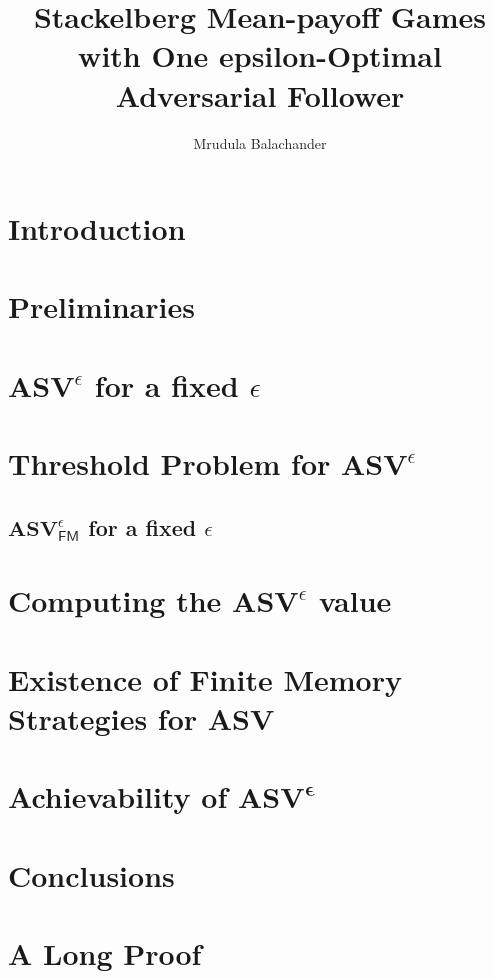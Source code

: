 \documentclass{report}
\begin{document}
\title{Stackelberg Mean-payoff Games with One epsilon-Optimal Adversarial Follower}
\author{Mrudula Balachander}
 
\beforepreface
{}
	
	
\afterpreface

\chapter{Introduction}
	\label{sec:intro}
	

\chapter{Preliminaries}
  	\label{sec:prelim}
  	

\chapter{$\mathbf{ASV}^{\epsilon}$ for a fixed $\epsilon$}
	

\chapter{Threshold Problem for $\mathbf{ASV}^{\epsilon}$}
	\label{sec:ThresholdProblem}
	
	\section{$\mathbf{ASV}^{\epsilon}_{\mathsf{FM}}$ for a fixed $\epsilon$}
		\label{sec:FMStrategy}
		

\chapter{Computing the $\mathbf{ASV}^{\epsilon}$ value}
	

\chapter{Existence of Finite Memory Strategies for ASV}
	\label{sec:FMASV}
	

\chapter{Achievability of $\mathbf{ASV^{\epsilon}}$}
	

\chapter{Conclusions}

\appendix
	\chapter{A Long Proof}
		


	
\end{document}
